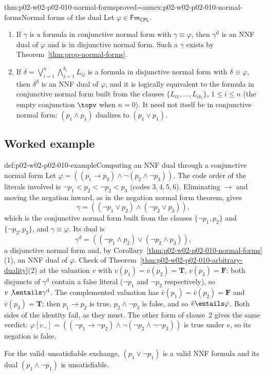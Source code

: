 \begin{hbcorollary}{thm:p02-w02-p02-010-normal-forms}{proved=annex:p02-w02-p02-010-normal-forms}{Normal forms of the dual}
Let \(\varphi\in\mathsf{Fm}_{\mathsf{CPL}}\).
\begin{enumerate}
  \item If \(\gamma\) is a formula in conjunctive normal form with
        \(\gamma\equiv\varphi\), then \(\gamma^{\mathrm d}\) is an NNF dual of
        \(\varphi\) and is in disjunctive normal form.  Such a \(\gamma\)
        exists by Theorem~\ref{thm:prop-normal-forms}.
  \item If \(\delta=\bigvee_{i=1}^n\bigwedge_{j=1}^{k_i}L_{ij}\) is a formula
        in disjunctive normal form with \(\delta\equiv\varphi\), then
        \(\delta^{\mathrm d}\) is an NNF dual of \(\varphi\), and it is
        logically equivalent to the formula in conjunctive normal form built
        from the clauses \(\{L_{i1},\ldots,L_{ik_i}\}\), \(1\leq i\leq n\)
        (the empty conjunction \(\topv\) when \(n=0\)).  It need not itself be
        in conjunctive normal form: \((p_1\land p_1)\) dualizes to
        \((p_1\lor p_1)\).
\end{enumerate}
\end{hbcorollary}

\subsection{Worked example}
\label{sec:p02-w02-p02-010-example}

\begin{hbexample}{def:p02-w02-p02-010-example}{Computing an NNF dual through a conjunctive normal form}
Let \(\varphi=((p_1\to p_2)\land\neg(p_2\land\neg p_3))\).  The code order of
the literals involved is \(\neg p_1<p_2<\neg p_2<p_3\) (codes \(3,4,5,6\)).
Eliminating \(\to\) and moving the negation inward, as in the negation normal
form theorem, gives
\[
 \gamma=((\neg p_1\lor p_2)\land(\neg p_2\lor p_3)),
\]
which is the conjunctive normal form built from the clauses
\(\{\neg p_1,p_2\}\) and \(\{\neg p_2,p_3\}\), and \(\gamma\equiv\varphi\).  Its
dual is
\[
 \gamma^{\mathrm d}=((\neg p_1\land p_2)\lor(\neg p_2\land p_3)),
\]
a disjunctive normal form and, by
Corollary~\ref{thm:p02-w02-p02-010-normal-forms}(1), an NNF dual of
\(\varphi\).  Check of
Theorem~\ref{thm:p02-w02-p02-010-arbitrary-duality}(2) at the valuation \(v\)
with \(v(p_1)=v(p_2)=\mathbf T\), \(v(p_3)=\mathbf F\): both disjuncts of
\(\gamma^{\mathrm d}\) contain a false literal (\(\neg p_1\) and \(\neg p_2\)
respectively), so \(v\not\entails\gamma^{\mathrm d}\).  The complemented
valuation has \(\bar v(p_1)=\bar v(p_2)=\mathbf F\) and
\(\bar v(p_3)=\mathbf T\); then \(p_1\to p_2\) is true, \(p_2\land\neg p_3\) is
false, and so \(\bar v\entails\varphi\).  Both sides of the identity fail, as
they must.  The other form of clause~2 gives the same verdict:
\(\varphi[\upsilon_{\neg}]=((\neg p_1\to\neg p_2)\land
\neg(\neg p_2\land\neg\neg p_3))\) is true under \(v\), so its negation is false.

For the valid--unsatisfiable exchange, \((p_1\lor\neg p_1)\) is a valid NNF
formula and its dual \((p_1\land\neg p_1)\) is unsatisfiable.
\end{hbexample}

